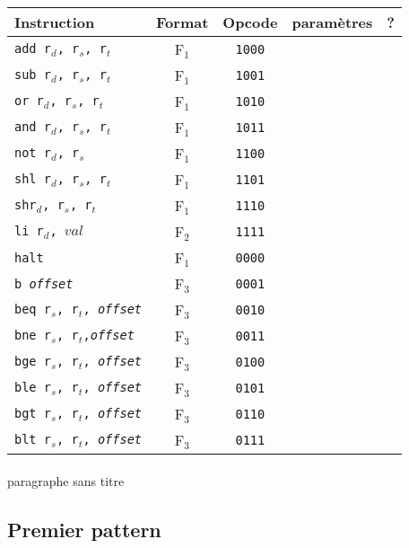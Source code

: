 \documentclass[a4paper]{article}
\begin{document}
			\begin{tabular}{|p{4cm}|c|c|c|c|}
			\hline Instruction & Format & Opcode & paramètres & ? \\ 
			\hline \texttt{add r$_{d}$, r$_{s}$, r$_{t}$} & F$_{1}$ & \texttt{1000} &  &  \\ 
			\hline \texttt{sub r$_{d}$, r$_{s}$, r$_{t}$} & F$_{1}$ & \texttt{1001} &  &  \\ 
			\hline \texttt{or r$_{d}$, r$_{s}$, r$_{t}$} & F$_{1}$ & \texttt{1010} &  &  \\ 
			\hline \texttt{and r$_{d}$, r$_{s}$, r$_{t}$} & F$_{1}$ & \texttt{1011} &  &  \\ 
			\hline \texttt{not r$_{d}$, r$_{s}$} & F$_{1}$ & \texttt{1100} &  &  \\ 
			\hline \texttt{shl r$_{d}$, r$_{s}$, r$_{t}$} & F$_{1}$ & \texttt{1101} &  &  \\ 
			\hline \texttt{shr$_{d}$, r$_{s}$, r$_{t}$} & F$_{1}$ & \texttt{1110} &  &  \\ 
			\hline \texttt{li r$_{d}$, $val$} & F$_{2}$ & \texttt{1111} &  &  \\ 
			\hline \texttt{halt} & F$_{1}$ & \texttt{0000} &  &  \\ 
			\hline \texttt{b \textit{offset}} & F$_{3}$ & \texttt{0001} &  &  \\
			\hline \texttt{beq r$_{s}$, r$_{t}$, \textit{offset}} & F$_{3}$ & \texttt{0010} &  &  \\ 
			\hline \texttt{bne r$_{s}$, r$_{t}$,\textit{offset}} & F$_{3}$ & \texttt{0011} &  &  \\ 
			\hline \texttt{bge r$_{s}$, r$_{t}$, \textit{offset}} & F$_{3}$ & \texttt{0100} &  &  \\ 
			\hline \texttt{ble r$_{s}$, r$_{t}$, \textit{offset}} & F$_{3}$ & \texttt{0101} &  &  \\ 
			\hline \texttt{bgt r$_{s}$, r$_{t}$, \textit{offset}} & F$_{3}$ & \texttt{0110} &  &  \\ 
			\hline \texttt{blt r$_{s}$, r$_{t}$, \textit{offset}} & F$_{3}$ & \texttt{0111} &  &  \\ 

			\hline 
			\end{tabular}
			
			\paragraph{}{paragraphe sans titre}
		
		\subsection{Premier pattern}
\end{document}
